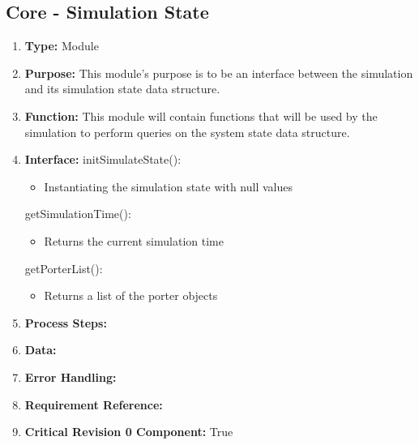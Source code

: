 \documentclass[paper=letter, fontsize=10pt]{scrartcl}
\numberwithin{equation}{section}		%
\numberwithin{figure}{section}			%
\numberwithin{table}{section}				%
\begin{document}
\subsection{Core - Simulation State}
\begin{enumerate}[]
	\item \textbf{Type:} Module
	\item \textbf{Purpose:} This module's purpose is to be an interface between the simulation and its simulation state data structure.
	\item \textbf{Function:} This module will contain functions that will be used by the simulation to perform queries on the system state data structure.
	\item \textbf{Interface:}\newline
	initSimulateState():
		\begin{itemize}
			\item Instantiating the simulation state with null values
		\end{itemize}
	getSimulationTime():
		\begin{itemize}
			\item Returns the current simulation time
		\end{itemize}
	getPorterList():
		\begin{itemize}
			\item Returns a list of the porter objects
		\end{itemize}
	
	\item \textbf{Process Steps:} 
	\item \textbf{Data:}
	\item \textbf{Error Handling:}
	\item \textbf{Requirement Reference:}
	\item \textbf{Critical Revision 0 Component:} True
\end{enumerate}
\end{document}
